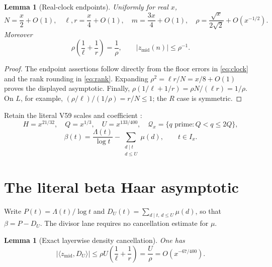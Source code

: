 \documentclass[10pt]{article}
\newtheorem{lemma}[theorem]{Lemma}
\newcommand{\ip}[2]{\langle #1,#2\rangle}
\newcommand{\zm}{z_{\mathrm{mid}}}
\newcommand{\Qx}{\mathcal Q_x}
\begin{document}
\begin{lemma}[Real-clock endpoints]\label{lem:endpoints}
Uniformly for real $x$,
\[
 N=\frac x2+O(1),\quad \ell,r=\frac x4+O(1),\quad
 m=\frac{3x}{4}+O(1),\quad
 \rho=\frac{\sqrt{x}}{2\sqrt2}+O(x^{-1/2}).
\]
Moreover
\begin{equation}
 \rho\left(\frac1\ell+\frac1r\right)=\frac1\rho,
 \qquad |\zm(n)|\leq\rho^{-1}.                     \label{eq:rhoidentities}
\end{equation}
\end{lemma}

\begin{proof}
The endpoint assertions follow directly from the floor errors in
\eqref{eq:clock} and the rank rounding in \eqref{eq:rank}.  Expanding
$\rho^2=\ell r/N=x/8+O(1)$ proves the displayed asymptotic.  Finally,
$\rho(1/\ell+1/r)=\rho N/(\ell r)=1/\rho$.  On $L$, for example,
$(\rho/\ell)/(1/\rho)=r/N\leq1$; the $R$ case is symmetric.
\end{proof}

Retain the literal V59 scales and coefficient \cite{v35,v51}:
\begin{equation}
 H=x^{21/32},\quad Q=x^{1/3},\quad U=x^{133/400},
 \quad \Qx=\{q\text{ prime}:Q<q\leq2Q\},             \label{eq:scales}
\end{equation}
\begin{equation}
 \beta(t)=\frac{\Lambda(t)}{\log t}
       -\sum_{\substack{d\mid t\\d\leq U}}\mu(d),
 \qquad t\in I_x.                                   \label{eq:beta}
\end{equation}

\section{The literal beta Haar asymptotic}

Write $P(t)=\Lambda(t)/\log t$ and
$D_U(t)=\sum_{d\mid t,\,d\leq U}\mu(d)$, so that $\beta=P-D_U$.
The divisor lane requires no cancellation estimate for $\mu$.

\begin{lemma}[Exact layerwise density cancellation]\label{lem:divisor}
One has
\begin{equation}
 \left|\ip{\zm}{D_U}\right|
 \leq \rho U\left(\frac1\ell+\frac1r\right)
 =\frac{U}{\rho}=O(x^{-67/400}).                    \label{eq:divisorbound}
\end{equation}
\end{lemma}
\end{document}

